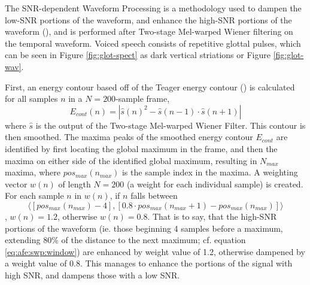 The SNR-dependent Waveform Processing is a methodology used to dampen the low-SNR portions of the waveform, and enhance the high-SNR portions of the waveform (\cite{macho:01}), and is performed after Two-stage Mel-warped Wiener filtering on the temporal waveform.  Voiced speech consists of repetitive glottal pulses, which can be seen in Figure \ref{fig:glot-spect} as dark vertical striations or Figure \ref{fig:glot-wav}.


First, an energy contour based off of the Teager energy contour (\cite{teager:80}) is calculated for all samples $n$ in a $N=200$-sample frame, \begin{equation} E_{cont}(n) = |\hat{s}(n)^2 - \hat{s}(n-1) \cdot \hat{s}(n+1)| \end{equation} where $\hat{s}$ is the output of the Two-stage Mel-warped Wiener Filter.  This contour is then smoothed.  The maxima peaks of the smoothed energy contour $E_{cont}$ are identified by first locating the global maximum in the frame, and then the maxima on either side of the identified global maximum, resulting in $N_{max}$ maxima, where $pos_{max}(n_{max})$ is the sample index in the maxima. A weighting vector $w(n)$ of length $N=200$ (a weight for each individual sample) is created.  For each sample $n$ in $w(n)$, if $n$ falls between \begin{equation}\label{eq:afe:swp:window} \langle [pos_{max}(n_{max})-4], [0.8 \cdot pos_{max}(n_{max}+1)-pos_{max}(n_{max})] \rangle \end{equation}, $w(n) = 1.2$, otherwise $w(n) = 0.8$. That is to say, that the high-SNR portions of the waveform (ie. those beginning 4 samples before a maximum, extending 80\% of the distance to the next maximum; cf. equation \ref{eq:afe:swp:window}) are enhanced by weight value of 1.2, otherwise dampened by a weight value of 0.8.  This manages to enhance the portions of the signal with high SNR, and dampens those with a low SNR.

